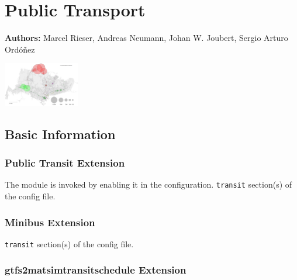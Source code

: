 \chapter{Public Transport}
\label{ch:pt}

\hfill \textbf{Authors:} Marcel Rieser, Andreas Neumann, Johan W. Joubert, Sergio Arturo Ordóñez

\begin{center} \includegraphics[width=0.25\textwidth, angle=0]{extending/figures/ebr/Backwards.png} \end{center}


\section{Basic Information}

\subsection{Public Transit Extension}

\createStandardInformationBasic%
{}%
{The module is invoked by enabling it in the configuration.}%
{\lstinline{transit} section(s) of the config file.}%
{\citet{Rieser2010}}


\subsection{Minibus Extension}

\createStandardInformationBasic%
{}%
{}%
{\lstinline{transit} section(s) of the config file.}%
{\citet{Neumann2014PhD}}

\subsection{gtfs2matsimtransitschedule Extension}

